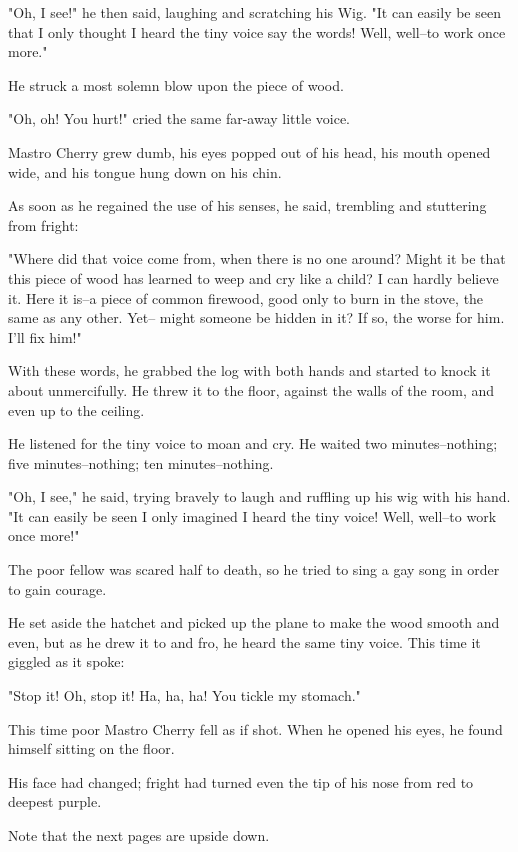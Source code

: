 \documentclass[12pt,twoside]{article}
\begin{document}
{  "Oh, I see!" he then said, laughing and scratching his Wig.
  "It can easily be seen that I only thought I heard the tiny
  voice say the words! Well, well--to work once more."
  
  He struck a most solemn blow upon the piece of wood.
  
  "Oh, oh!  You hurt!" cried the same far-away little voice.
  
  Mastro Cherry grew dumb, his eyes popped out of his
  head, his mouth opened wide, and his tongue hung down
  on his chin.
  
  As soon as he regained the use of his senses, he said,
  trembling and stuttering from fright:
  
  "Where did that voice come from, when there is no
  one around?  Might it be that this piece of wood has
  learned to weep and cry like a child?  I can hardly
  believe it.  Here it is--a piece of common firewood, good
  only to burn in the stove, the same as any other.  Yet--
  might someone be hidden in it?  If so, the worse for him.
  I'll fix him!"
  
  With these words, he grabbed the log with both hands
  and started to knock it about unmercifully.  He threw it
  to the floor, against the walls of the room, and even up
  to the ceiling.
  
  He listened for the tiny voice to moan and cry.
  He waited two minutes--nothing; five minutes--nothing;
  ten minutes--nothing.
  
  "Oh, I see," he said, trying bravely to laugh and
  ruffling up his wig with his hand.  "It can easily be seen
  I only imagined I heard the tiny voice!  Well, well--to
  work once more!"

  The poor fellow was scared half to death, so he tried
  to sing a gay song in order to gain courage.
  
  He set aside the hatchet and picked up the plane to
  make the wood smooth and even, but as he drew it to
  and fro, he heard the same tiny voice.  This time it giggled
  as it spoke:
  
  "Stop it!  Oh, stop it!  Ha, ha, ha! You tickle my stomach."
  
  This time poor Mastro Cherry fell as if shot.  When
  he opened his eyes, he found himself sitting on the floor.
  
  His face had changed; fright had turned even the tip of
  his nose from red to deepest purple.

}
\bigskip
Note that the next pages are upside down.
\end{document}

